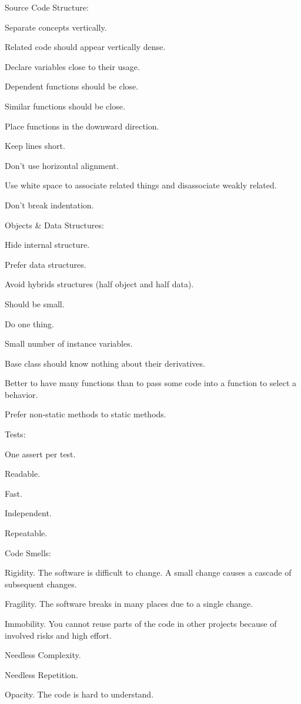 Source Code Structure:
\bit
\item Separate concepts vertically.
\item Related code should appear vertically dense.
\item Declare variables close to their usage.
\item Dependent functions should be close.
\item Similar functions should be close.
\item Place functions in the downward direction.
\item Keep lines short.
\item Don't use horizontal alignment.
\item Use white space to associate related things and disassociate weakly related.
\item Don't break indentation.
\eit

Objects \& Data Structures:
\bit
\item Hide internal structure.
\item Prefer data structures.
\item Avoid hybrids structures (half object and half data).
\item Should be small.
\item Do one thing.
\item Small number of instance variables.
\item Base class should know nothing about their derivatives.
\item Better to have many functions than to pass some code into a function to select a behavior.
\item Prefer non-static methods to static methods.
\eit

Tests:
\bit
\item One assert per test.
\item Readable.
\item Fast.
\item Independent.
\item Repeatable.
\eit

Code Smells:
\bit
\item Rigidity. The software is difficult to change. A small change causes a cascade of subsequent changes.
\item Fragility. The software breaks in many places due to a single change.
\item Immobility. You cannot reuse parts of the code in other projects because of involved risks and high effort.
\item Needless Complexity.
\item Needless Repetition.
\item Opacity. The code is hard to understand.
\eit

